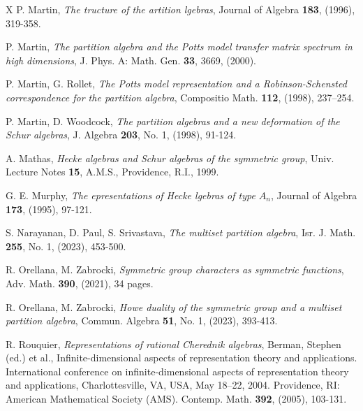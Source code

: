 \documentclass[10pt,hidelinks]{article}
\numberwithin{equation}{section}
\begin{document}
\begin{thebibliography}{X}
P. Martin, 
  \textit{The {\it {\color{black}{s}}}tructure of the {\it {\color{black}{p}}}artition
    {\it {\color{black}{a}}}lgebras}, 
  Journal of Algebra {\bf 183}, (1996), 319-358.

P. Martin, 
{\it The partition algebra and the Potts model transfer
matrix spectrum in high dimensions}, 
J. Phys. A: Math. Gen. {\bf 33}, 3669, (2000). 


  

P. Martin, G. Rollet, {\it The Potts model representation and a Robinson-Schensted
  correspondence for the partition algebra}, Compositio Math. {\bf 112}, (1998), 237–254. 


P. Martin, D. Woodcock, {\it
The partition algebras and a new deformation of the Schur algebras}, 
J. Algebra {\bf 203}, No. 1, (1998), 91-124. 



{}




  

A. Mathas, \textit{Hecke algebras and Schur algebras of the symmetric group}, Univ. Lecture Notes {\bf 15},
A.M.S., Providence, R.I., 1999.

  
G. E. Murphy, \textit{The {\it {\color{black}{r}}}epresentations of
  Hecke {\it {\color{black}{a}}}lgebras of type $A_n$},
  Journal of Algebra {\bf 173}, (1995), 97-121.


S. Narayanan, D. Paul, S. Srivastava, \textit{The multiset partition algebra}, 
Isr. J. Math. {\bf 255}, No. 1, (2023), 453-500. 

  
R. Orellana, M. Zabrocki, 
{\it Symmetric group characters as symmetric functions},
Adv. Math. {\bf 390}, (2021), 34 pages. 

R. Orellana, M. Zabrocki, 
{\it Howe duality of the symmetric group and a multiset partition algebra}, 
Commun. Algebra {\bf 51}, No. 1, (2023), 393-413. 



R. Rouquier, 
{\it Representations of rational Cherednik algebras}, 
Berman, Stephen (ed.) et al., Infinite-dimensional aspects of representation theory and applications. International conference on infinite-dimensional aspects of representation theory and applications,
Charlottesville, VA, USA, May 18–22, 2004. Providence, RI: American Mathematical Society (AMS).
Contemp. Math. {\bf 392}, (2005), 103-131. 





\end{thebibliography}
\end{document}

